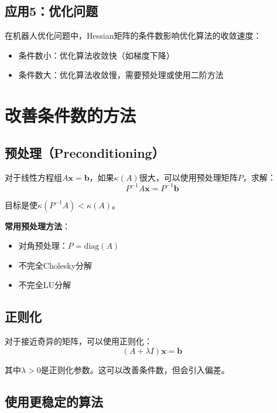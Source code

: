\documentclass[12pt,a4paper]{article}
\begin{document}
\subsection{应用5：优化问题}

在机器人优化问题中，Hessian矩阵的条件数影响优化算法的收敛速度：

\begin{itemize}
\item 条件数小：优化算法收敛快（如梯度下降）
\item 条件数大：优化算法收敛慢，需要预处理或使用二阶方法
\end{itemize}

\section{改善条件数的方法}

\subsection{预处理（Preconditioning）}

对于线性方程组$A\bm{x} = \bm{b}$，如果$\kappa(A)$很大，可以使用预处理矩阵$P$，求解：
\begin{equation}
P^{-1}A\bm{x} = P^{-1}\bm{b}
\end{equation}

目标是使$\kappa(P^{-1}A) < \kappa(A)$。

\textbf{常用预处理方法}：
\begin{itemize}
\item 对角预处理：$P = \text{diag}(A)$
\item 不完全Cholesky分解
\item 不完全LU分解
\end{itemize}

\subsection{正则化}

对于接近奇异的矩阵，可以使用正则化：
\begin{equation}
(A + \lambda I)\bm{x} = \bm{b}
\end{equation}

其中$\lambda > 0$是正则化参数。这可以改善条件数，但会引入偏差。

\subsection{使用更稳定的算法}
\end{document}
